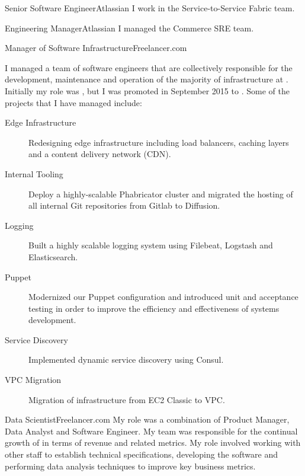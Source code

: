 \begin{professionalExperience}

{Senior Software Engineer}{Atlassian}
{I work in the Service-to-Service Fabric team.}

{Engineering Manager}{Atlassian}
{I managed the Commerce SRE team.}

{Manager of Software Infrastructure}{Freelancer.com}
{
  I managed a team of software engineers that are collectively
  responsible for the development, maintenance and operation of the majority of
  infrastructure at . Initially my role was
  , but I was promoted in September
  2015 to . Some of the projects
  that I have managed include:

  \begin{description}
    \item[Edge Infrastructure] Redesigning edge infrastructure including load
      balancers, caching layers and a content delivery network (CDN).
    \item[Internal Tooling] Deploy a highly-scalable Phabricator cluster and
      migrated the hosting of all internal Git repositories from Gitlab to
      Diffusion.
    \item[Logging] Built a highly scalable logging system using Filebeat,
      Logstash and Elasticsearch.
    \item[Puppet] Modernized our Puppet configuration and introduced unit and
      acceptance testing in order to improve the efficiency and effectiveness of
      systems development.
    \item[Service Discovery] Implemented dynamic service discovery using Consul.
    \item[VPC Migration] Migration of infrastructure from EC2 Classic to VPC\@.
  \end{description}
}

{Data Scientist}{Freelancer.com}
{
  My role was a combination of Product Manager, Data Analyst and Software
  Engineer. My team was responsible for the continual growth of
   in terms of revenue and related metrics. My role
  involved working with other staff to establish technical specifications,
  developing the software and performing data analysis techniques to improve key
  business metrics.
}

\end{professionalExperience}
